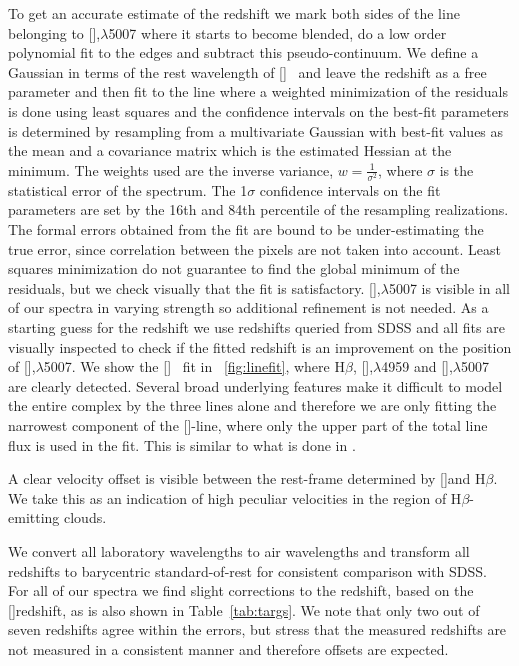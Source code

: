 \documentclass{aa}    %
\newcommand{\figref}[1]{\ref{fig:#1}}
\newcommand{\Fig}[1]{\figurename~\figref{#1}}
\newcommand{\fig}[1]{\Fig{#1}}
\newcommand{\Tab}[1]{Table~\ref{tab:#1}}
\newcommand{\tab}[1]{\Tab{#1}}
\newcommand{\hb}{H$\beta$}
\newcommand{\oii}{[\ion{O}{ii}]}
\newcommand{\oiii}{[\ion{O}{iii}]}
\begin{document}
To get an accurate estimate of the redshift we mark both sides of the line belonging to \oiii,$\lambda$5007 where it starts to become blended, do a low order polynomial fit to the edges and subtract this pseudo-continuum. We define a Gaussian in terms of the rest wavelength of \oiii~ and leave the redshift as a free parameter and then fit to the line where a weighted minimization of the residuals is done using least squares and the confidence intervals on the best-fit parameters is determined by resampling from a multivariate Gaussian with best-fit values as the mean and a covariance matrix which is the estimated Hessian at the minimum. The weights used are the inverse variance, $ w =  \frac{1}{\sigma^2}$, where $\sigma$ is the statistical error of the spectrum. The 1$\sigma$ confidence intervals on the fit parameters are set by the 16th and 84th percentile of the resampling realizations. The formal errors obtained from the fit are bound to be under-estimating the true error, since correlation between the pixels are not taken into account. Least squares minimization do not guarantee to find the global minimum of the residuals, but we check visually that the fit is satisfactory. \oiii,$\lambda$5007 is visible in all of our spectra in varying strength so additional refinement is not needed. As a starting guess for the redshift we use redshifts queried from SDSS and all fits are visually inspected to check if the fitted redshift is an improvement on the position of \oiii,$\lambda$5007. We show the \oiii~ fit in \fig{linefit}, where \hb, \oiii,$\lambda$4959 and \oiii,$\lambda$5007 are clearly detected. Several broad underlying features make it difficult to model the entire complex by the three lines alone and therefore we are only fitting the narrowest component of the \oiii-line, where only the upper part of the total line flux is used in the fit. This is similar to what is done in \citep{VandenBerk2001}. 

A clear velocity offset is visible between the rest-frame determined by \oii and \hb. We take this as an indication of high peculiar velocities in the region of \hb-emitting clouds. 

We convert all laboratory wavelengths to air wavelengths and transform all redshifts to barycentric standard-of-rest for consistent comparison with SDSS. For all of our spectra we find slight corrections to the redshift, based on the \oiii redshift, as is also shown in \tab{targs}. We note that only two out of seven redshifts agree within the errors, but stress that the measured redshifts are not measured in a consistent manner and therefore offsets are expected. 
\end{document}
